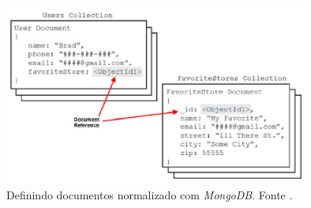 \begin{figure}[ht]
	\centering
	\includegraphics[width=10cm]{figuras/normalizacao.eps}
	\caption{Definindo documentos normalizado com \emph{MongoDB}. Fonte \cite{Dayley2014}.}
	\label{normalizacao}
\end{figure}



